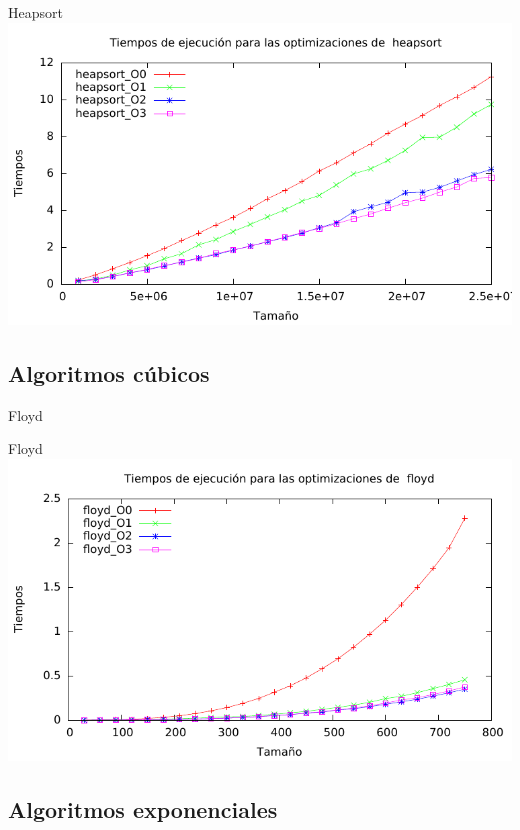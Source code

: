 \documentclass[10pt,compress,usetitleprogressbar,mathserif]{beamer}
\begin{document}
\begin{frame}{Heapsort}
	\includegraphics[width = \textwidth ]{img/heapsort_optim_g.pdf}
\end{frame}

\subsection{Algoritmos cúbicos}

\begin{frame}{Floyd}
	
\end{frame}

\begin{frame}{Floyd}
	\includegraphics[width = \textwidth ]{img/floyd_optim_g.pdf}
\end{frame}

\subsection{Algoritmos exponenciales}
\end{document}
